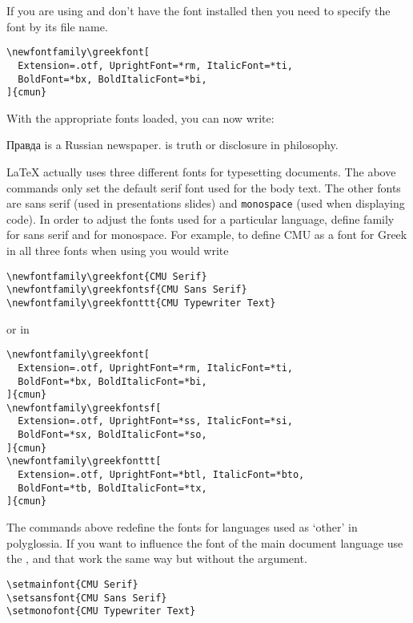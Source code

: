 If you are using  and don't have the font installed then you
need to specify the font by its file name.
\begin{verbatim}
\newfontfamily\greekfont[
  Extension=.otf, UprightFont=*rm, ItalicFont=*ti,
  BoldFont=*bx, BoldItalicFont=*bi,
]{cmun}
\end{verbatim}

With the appropriate fonts loaded, you can now write:
{
  \setmonofont{cmuntt.otf}
  \begin{example}[examplewidth=0.4\linewidth]
\newfontfamily{}
\newfontfamily{}

\textrussian{Правда} is
a Russian newspaper.
 is truth
or disclosure in philosophy.
  \end{example}
}

\LaTeX{} actually uses three different fonts for typesetting documents. The
above commands only set the default serif font used for the body text. The
other fonts are \textsf{sans serif} (used in presentations slides) and
\texttt{monospace} (used when displaying code). In order to adjust the fonts used for
a particular language, define  family for sans serif and
 for monospace. For example, to define CMU as a
font for Greek in all three fonts when using  you would write
\begin{verbatim}
\newfontfamily\greekfont{CMU Serif}
\newfontfamily\greekfontsf{CMU Sans Serif}
\newfontfamily\greekfonttt{CMU Typewriter Text}
\end{verbatim}
\pagebreak[3]
or in 
\begin{verbatim}
\newfontfamily\greekfont[
  Extension=.otf, UprightFont=*rm, ItalicFont=*ti,
  BoldFont=*bx, BoldItalicFont=*bi,
]{cmun}
\newfontfamily\greekfontsf[
  Extension=.otf, UprightFont=*ss, ItalicFont=*si,
  BoldFont=*sx, BoldItalicFont=*so, 
]{cmun}
\newfontfamily\greekfonttt[
  Extension=.otf, UprightFont=*btl, ItalicFont=*bto,
  BoldFont=*tb, BoldItalicFont=*tx, 
]{cmun}
\end{verbatim}

The commands above redefine the fonts for languages used as \enquote*{other} in
polyglossia. If you want to influence the font of the main document language
use the ,  and  that work the
same way but without the  argument.
\begin{verbatim}
\setmainfont{CMU Serif}
\setsansfont{CMU Sans Serif}
\setmonofont{CMU Typewriter Text}
\end{verbatim}

